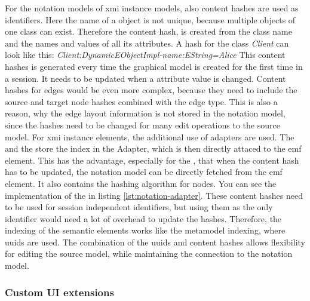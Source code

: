   For the notation models of \ac{xmi} instance models, also content hashes are used as identifiers. Here the name of a object is not unique, because multiple objects of one class can exist. Therefore the content hash, is created from the class name and the names and values of all its attributes. A hash for the class \textit{Client} can look like this: \textit{Client:DynamicEObjectImpl-name:EString=Alice} This content hashes is generated every time the graphical model is created for the first time in a session. It needs to be updated when a attribute value is changed. Content hashes for edges would be even more complex, because they need to include the source and target node hashes combined with the edge type. This is also a reason, why the edge layout information is not stored in the notation model, since the hashes need to be changed for many edit operations to the source model. For \ac{xmi} instance elements, the additional use of adapters are used. The  and the  store the index in the Adapter, which is then directly attaced to the \ac{emf} element. This has the advantage, especially for the , that when the content hash has to be updated, the notation model can be directly fetched from the \ac{emf} element. It also contains the hashing algorithm for nodes. You can see the implementation of the  in listing \ref{lst:notation-adapter}. These content hashes need to be used for session independent identifiers, but using them as the only identifier would need a lot of overhead to update the hashes. Therefore, the indexing of the semantic elements works like the metamodel indexing, where \acp{uuid} are used. 
  The combination of the \acp{uuid} and content hashes allows flexibility for editing the source model, while maintaining the connection to the notation model.

  \subsubsection{Custom UI extensions}
  \label{subsec:custom-ui-extensions}

